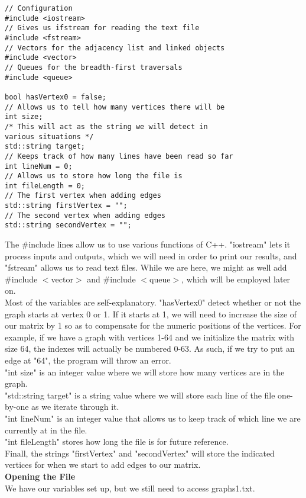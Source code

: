 \documentclass{article}
\begin{document}
\begin{lstlisting}
// Configuration
#include <iostream>
// Gives us ifstream for reading the text file
#include <fstream>
// Vectors for the adjacency list and linked objects
#include <vector>
// Queues for the breadth-first traversals
#include <queue>

bool hasVertex0 = false;
// Allows us to tell how many vertices there will be
int size;
/* This will act as the string we will detect in 
various situations */
std::string target;
// Keeps track of how many lines have been read so far
int lineNum = 0;
// Allows us to store how long the file is
int fileLength = 0;
// The first vertex when adding edges
std::string firstVertex = "";
// The second vertex when adding edges
std::string secondVertex = "";
\end{lstlisting}
The \#include lines allow us to use various functions of C++. "iostream" lets it process inputs and outputs, which we will need in order to print our results, and "fstream" allows us to read text files. While we are here, we might as well add \#include $<$vector$>$ and \#include $<$queue$>$, which will be employed later on. \\
Most of the variables are self-explanatory. "hasVertex0" detect whether or not the graph starts at vertex 0 or 1. If it starts at 1, we will need to increase the size of our matrix by 1 so as to compensate for the numeric positions of the vertices. For example, if we have a graph with vertices 1-64 and we initialize the matrix with size 64, the indexes will actually be numbered 0-63. As such, if we try to put an edge at "64", the program will throw an error. \\
"int size" is an integer value where we will store how many vertices are in the graph. \\
"std::string target" is a string value where we will store each line of the file one-by-one as we iterate through it. \\
"int lineNum" is an integer value that allows us to keep track of which line we are currently at in the file. \\
"int fileLength" stores how long the file is for future reference. \\
Finall, the strings "firstVertex" and "secondVertex" will store the indicated vertices for when we start to add edges to our matrix. \\

\textbf{Opening the File} \\
We have our variables set up, but we still need to access graphs1.txt.
\end{document}
